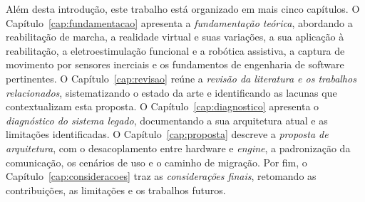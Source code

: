 Além desta introdução, este trabalho está organizado em mais cinco capítulos. O
Capítulo~\ref{cap:fundamentacao} apresenta a \emph{fundamentação teórica}, abordando a
reabilitação de marcha, a realidade virtual e suas variações, a sua aplicação à
reabilitação, a eletroestimulação funcional e a robótica assistiva, a captura de
movimento por sensores inerciais e os fundamentos de engenharia de software pertinentes.
O Capítulo~\ref{cap:revisao} reúne a \emph{revisão da literatura e os trabalhos
relacionados}, sistematizando o estado da arte e identificando as lacunas que
contextualizam esta proposta. O Capítulo~\ref{cap:diagnostico} apresenta o
\emph{diagnóstico do sistema legado}, documentando a sua arquitetura atual e as
limitações identificadas. O Capítulo~\ref{cap:proposta} descreve a \emph{proposta de
arquitetura}, com o desacoplamento entre hardware e \emph{engine}, a padronização da
comunicação, os cenários de uso e o caminho de migração. Por fim, o
Capítulo~\ref{cap:consideracoes} traz as \emph{considerações finais}, retomando as
contribuições, as limitações e os trabalhos futuros.
